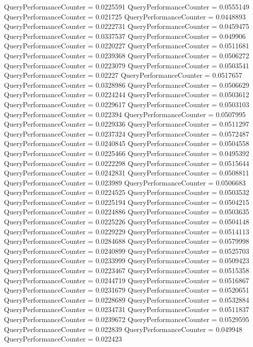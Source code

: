 \documentclass[9pt]{article}
\theoremstyle{plain}
\theoremstyle{definition}
\theoremstyle{remark}
\numberwithin{equation}{section}
\begin{document}
QueryPerformanceCounter  =  0.0225591
QueryPerformanceCounter  =  0.0555149
QueryPerformanceCounter  =  0.021725
QueryPerformanceCounter  =  0.0448893
QueryPerformanceCounter  =  0.0222731
QueryPerformanceCounter  =  0.0459475
QueryPerformanceCounter  =  0.0337537
QueryPerformanceCounter  =  0.049906
QueryPerformanceCounter  =  0.0220227
QueryPerformanceCounter  =  0.0511681
QueryPerformanceCounter  =  0.0239368
QueryPerformanceCounter  =  0.0506272
QueryPerformanceCounter  =  0.0223079
QueryPerformanceCounter  =  0.0503541
QueryPerformanceCounter  =  0.02227
QueryPerformanceCounter  =  0.0517657
QueryPerformanceCounter  =  0.0328986
QueryPerformanceCounter  =  0.0506629
QueryPerformanceCounter  =  0.0224244
QueryPerformanceCounter  =  0.0503612
QueryPerformanceCounter  =  0.0229617
QueryPerformanceCounter  =  0.0503103
QueryPerformanceCounter  =  0.022394
QueryPerformanceCounter  =  0.0507995
QueryPerformanceCounter  =  0.0229336
QueryPerformanceCounter  =  0.0511297
QueryPerformanceCounter  =  0.0237324
QueryPerformanceCounter  =  0.0572487
QueryPerformanceCounter  =  0.0240845
QueryPerformanceCounter  =  0.0504558
QueryPerformanceCounter  =  0.0225466
QueryPerformanceCounter  =  0.0495392
QueryPerformanceCounter  =  0.0222298
QueryPerformanceCounter  =  0.0515644
QueryPerformanceCounter  =  0.0242831
QueryPerformanceCounter  =  0.0508811
QueryPerformanceCounter  =  0.023989
QueryPerformanceCounter  =  0.0506683
QueryPerformanceCounter  =  0.0224525
QueryPerformanceCounter  =  0.0503532
QueryPerformanceCounter  =  0.0225194
QueryPerformanceCounter  =  0.0504215
QueryPerformanceCounter  =  0.0224886
QueryPerformanceCounter  =  0.0503635
QueryPerformanceCounter  =  0.0225226
QueryPerformanceCounter  =  0.0504148
QueryPerformanceCounter  =  0.0229229
QueryPerformanceCounter  =  0.0514113
QueryPerformanceCounter  =  0.0284688
QueryPerformanceCounter  =  0.0579998
QueryPerformanceCounter  =  0.0240899
QueryPerformanceCounter  =  0.0525703
QueryPerformanceCounter  =  0.0233999
QueryPerformanceCounter  =  0.0509423
QueryPerformanceCounter  =  0.0223467
QueryPerformanceCounter  =  0.0515358
QueryPerformanceCounter  =  0.0244719
QueryPerformanceCounter  =  0.0516867
QueryPerformanceCounter  =  0.0231679
QueryPerformanceCounter  =  0.0520651
QueryPerformanceCounter  =  0.0228689
QueryPerformanceCounter  =  0.0532884
QueryPerformanceCounter  =  0.0234731
QueryPerformanceCounter  =  0.0511837
QueryPerformanceCounter  =  0.0239672
QueryPerformanceCounter  =  0.0529595
QueryPerformanceCounter  =  0.022839
QueryPerformanceCounter  =  0.049948
QueryPerformanceCounter  =  0.022423
\end{document}
